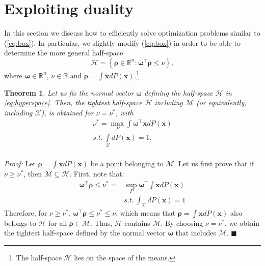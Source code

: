 \documentclass[twocolumn]{autart}
\newtheorem{theorem}{Theorem}
\newenvironment*{proof}{\emph{Proof:}}{}
\newcommand{\DP}[1]{{#1}}
\newcommand{\xhyp}{\mathbf{\rho}}
\begin{document}
 \section{Exploiting duality}
 \label{sec:dual}
 In this section we discuss how to efficiently solve optimization problems similar to  (\ref{eq:box}).
 In particular, we slightly modify (\ref{eq:box}) in order to be able to determine the more general half-space
  \begin{equation}
\label{eq:hyperspace}
\mathcal{H}=\left\{ \xhyp \in \mathbb{R}^n:   \boldsymbol{\omega}^\top  \xhyp \leq \nu \right\},
 \end{equation}
  where $\boldsymbol{\omega}\in \mathbb{R}^n$, $\nu \in \mathbb{R}$ and $\xhyp= \int    \mathbf{x}  dP(\mathbf{x})$.\footnote{The half-space $\mathcal{H}$ lies on the space of the means.}


\begin{theorem} \label{Th:fstar}
  Let us fix the normal vector $\boldsymbol{\omega}$ defining the half-space $\mathcal{H}$  in \eqref{eq:hyperspace}. Then,   the tightest half-space $\mathcal{H}$ including $\mathcal{M}$ (or equivalently, including $\mathcal{X}$),  is obtained for $\nu= \nu^*$, with
  \begin{equation}
\label{eqn:proofProp2}
 \begin{array}{l}
\nu^*=\max\limits_{P} \int \boldsymbol{\omega}^\top\mathbf{x} dP(\mathbf{x})  \\
s.t.~  \int\limits_{\mathcal{X}} dP(\mathbf{x})= 1.\\
\end{array}
 \end{equation}
\end{theorem}
\begin{proof}
Let $\xhyp = \int    \mathbf{x}  dP(\mathbf{x})$ be a point belonging to $\mathcal{M}$. Let us first \DP{prove} that if $\nu\geq \nu^*$, then $\mathcal{M} \subseteq \mathcal{H}$.
 First, note that:
\begin{align}
\nonumber
\boldsymbol{\omega}^\top \xhyp  \leq \nu^*= & \sup_P  \boldsymbol{\omega}^\top  \int    \mathbf{x}  dP(\mathbf{x})\\
\nonumber
& s.t. \ \int_{\mathcal{X}}dP(\mathbf{x})=1
\end{align}
Therefore, for $\nu\geq \nu^*$,  $\boldsymbol{\omega}^\top  \xhyp \leq \nu^* \leq \nu$, which means that $\xhyp= \int    \mathbf{x}  dP(\mathbf{x})$ also belongs to $\mathcal{H}$ for all $\xhyp \in \mathcal{M}$. Thus,  $\mathcal{H}$ contains  $\mathcal{M}$.
By choosing $\nu=\nu^*$, we obtain the tightest half-space defined by the normal vector $\boldsymbol{\omega}$ that includes $\mathcal{M}$.
\hfill $\blacksquare$
\end{proof}
\end{document}

